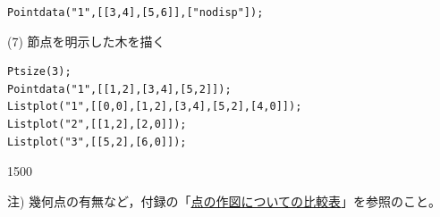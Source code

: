 \documentclass[papersize,a4paper,12pt,uplatex]{jsarticle}
\begin{document}
\begin{description}
\hspace{10mm} \verb|Pointdata("1",[[3,4],[5,6]],["nodisp"]);|



(7) 節点を明示した木を描く
\begin{verbatim}
Ptsize(3); 
Pointdata("1",[[1,2],[3,4],[5,2]]); 
Listplot("1",[[0,0],[1,2],[3,4],[5,2],[4,0]]); 
Listplot("2",[[1,2],[2,0]]); 
Listplot("3",[[5,2],[6,0]]);
\end{verbatim}

\begin{layer}{150}{0}
\end{layer}


注) 幾何点の有無など，付録の「\hyperlink{mkpttable}{点の作図についての比較表}」を参照のこと。












\end{description}
\end{document}
